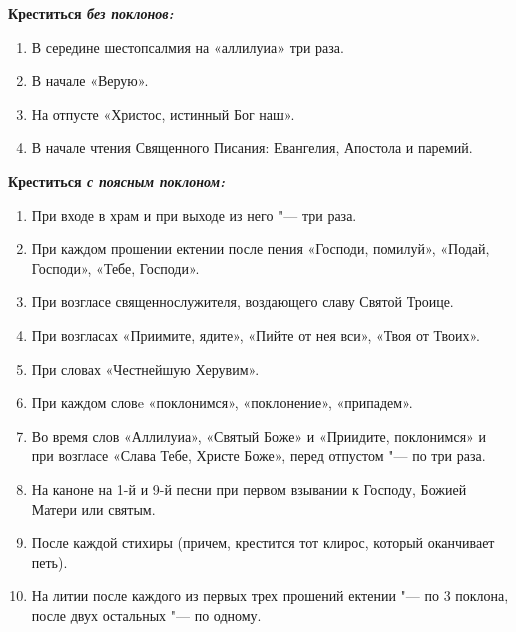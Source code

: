 \mychapterending

 


\bfseries Креститься \itshape без поклонов: \normalfont{}

\begin{enumerate}

\item В середине шестопсалмия на «аллилуиа» три раза. 

\item В начале «Верую». 

\item На отпусте «Христос, истинный Бог наш». 

\item В начале чтения Священного Писания: Евангелия, Апостола и паремий. 

\end{enumerate}

\bfseries Креститься \itshape с поясным поклоном: \normalfont{}

\begin{enumerate}

\item При входе в храм и при выходе из него "--- три раза. 

\item При каждом прошении ектении после пения «Господи, помилуй», «Подай, Господи», «Тебе, Господи». 

\item При возгласе священнослужителя, воздающего славу Святой Троице. 

\item При возгласах «Приимите, ядите», «Пийте от нея вси», «Твоя от Твоих». 

\item При словах «Честнейшую Херувим». 

\item При каждом словe «поклонимся», «поклонение», «припадем». 

\item Во время слов «Аллилуиа», «Святый Боже» и «Приидите, поклонимся» и при возгласе «Слава Тебе, Христе Боже», перед отпустом "--- по три раза. 

\item На каноне на 1-й и 9-й песни при первом взывании к Господу, Божией Матери или святым.

\item После каждой стихиры (причем, крестится тот клирос, который оканчивает петь).

\item На литии после каждого из первых трех прошений ектении "--- по 3 поклона, после двух остальных "--- по одному.

\end{enumerate}

